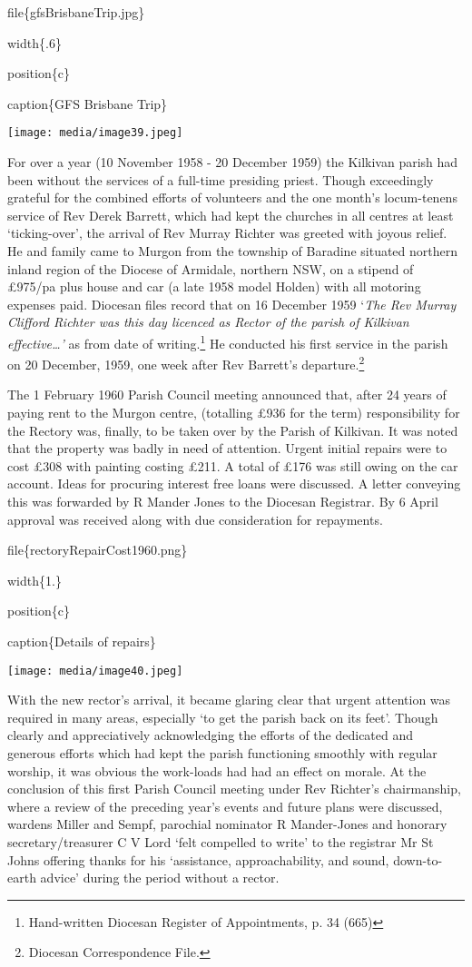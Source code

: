 file\{gfsBrisbaneTrip.jpg\}

width\{.6\}

position\{c\}

caption\{GFS Brisbane Trip\}

\texttt{[image: media/image39.jpeg]}

For over a year (10 November 1958 - 20 December 1959) the Kilkivan parish had been without the services of a full-time presiding priest. Though exceedingly grateful for the combined efforts of volunteers and the one month's locum-tenens service of Rev Derek Barrett, which had kept the churches in all centres at least `ticking-over', the arrival of Rev Murray Richter was greeted with joyous relief. He and family came to Murgon from the township of Baradine situated northern inland region of the Diocese of Armidale, northern NSW, on a stipend of £975/pa plus house and car (a late 1958 model Holden) with all motoring expenses paid. Diocesan files record that on 16 December 1959 `\emph{The Rev Murray Clifford Richter was this day licenced as Rector of the parish of Kilkivan effective\ldots'} as from date of writing.\footnote{Hand-written Diocesan Register of Appointments, p. 34 (665)} He conducted his first service in the parish on 20 December, 1959, one week after Rev Barrett's departure.\footnote{Diocesan Correspondence File.}

The 1 February 1960 Parish Council meeting announced that, after 24 years of paying rent to the Murgon centre, (totalling £936 for the term) responsibility for the Rectory was, finally, to be taken over by the Parish of Kilkivan. It was noted that the property was badly in need of attention. Urgent initial repairs were to cost £308 with painting costing £211. A total of £176 was still owing on the car account. Ideas for procuring interest free loans were discussed. A letter conveying this was forwarded by R Mander Jones to the Diocesan Registrar. By 6 April approval was received along with due consideration for repayments.

file\{rectoryRepairCost1960.png\}

width\{1.\}

position\{c\}

caption\{Details of repairs\}

\texttt{[image: media/image40.jpeg]}

With the new rector's arrival, it became glaring clear that urgent attention was required in many areas, especially `to get the parish back on its feet'. Though clearly and appreciatively acknowledging the efforts of the dedicated and generous efforts which had kept the parish functioning smoothly with regular worship, it was obvious the work-loads had had an effect on morale. At the conclusion of this first Parish Council meeting under Rev Richter's chairmanship, where a review of the preceding year's events and future plans were discussed, wardens Miller and Sempf, parochial nominator R Mander-Jones and honorary secretary/treasurer C V Lord `felt compelled to write' to the registrar Mr St Johns offering thanks for his `assistance, approachability, and sound, down-to-earth advice' during the period without a rector.

